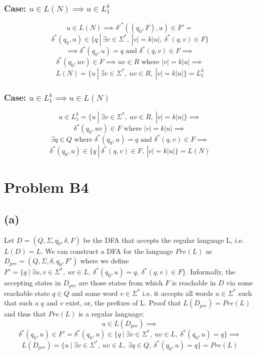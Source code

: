 \documentclass[12pt]{article}
\begin{document}
  \subsubsection*{Case: $u \in L(N) \implies u \in L_1^k$}
  $$ u \in L(N) \implies \delta{'}^*((q_0, F), u) \in F' = $$
  $$ \delta^*(q_0, u) \in \{q \:|\: \exists v \in \Sigma^* ,\:
  |v| = k|u| ,\: \delta^*(q,v) \in F\}$$
  $$\implies \delta^*(q_0, u) = q \text{ and } \delta^*(q,v) \in F \implies$$
  $$\delta^*(q_0, uv) \in F \implies uv \in R \text{ where }|v|= k|u| \implies$$
  $$L(N)=\{u \:|\: \exists v \in \Sigma^* ,\: uv \in R ,\: |v| = k|u|\}=L_1^k$$
  \subsubsection*{Case: $u \in L_1^k \implies u \in L(N)$}
  $$u \in L_1^k = \{u \:|\: \exists v \in \Sigma^* ,\: uv \in R ,\: |v| = k|u|\}
  \implies$$ $$\delta^*(q_0, uv) \in F  \text{ where } |v| = k|u| \implies$$
  $$\exists q \in Q \text{ where } \delta^*(q_0, u) = q \text { and }
  \delta^*(q, v) \in F \implies$$
  $$\delta^*(q_0, u) \in \{q \:|\: \delta^*(q,v) \in F ,\: |v| = k|u|\}= L(N)$$

\section*{Problem B4}
\subsection*{(a)}
  Let $D = (Q, \Sigma, q_0, \delta, F)$ be the DFA that accepts the regular
  language L, i.e. $L(D) = L$. We can construct a DFA for the language
  $Pre(L)$ as $D_{pre} = (Q, \Sigma, \delta, q_0, F')$ where we define
  $F' = \{q \:|\: \exists u,v \in \Sigma^* ,\: uv \in L
  ,\: \delta^* (q_0, u) = q ,\: \delta^* (q, v) \in F\}$.
  Informally, the accepting states in $D_{pre}$ are those states from which
  $F$ is reachable in $D$ via some reachable state $q \in Q$ and some
  word $v \in \Sigma^*$ i.e. it accepts all words $u \in \Sigma^*$
  such that such a $q$ and $v$ exist, or, the prefixes of L.
  Proof that $L(D_{pre}) = Pre(L)$ and thus that $Pre(L)$ is a regular language:
  $$u \in L(D_{pre}) \implies$$ $$\delta^*(q_0, u) \in F' =
  \delta^*(q_0, u) \in \{q \:|\: \exists v \in \Sigma^* ,\: uv \in L
  ,\: \delta^*(q_0, u) = q\} \implies$$
  $$L(D_{pre}) = \{u \:|\: \exists v \in \Sigma^* ,\: uv \in L ,\:
  \exists q \in Q ,\: \delta^*(q_0, u) = q \}
  = Pre(L)$$
 
\end{document}
